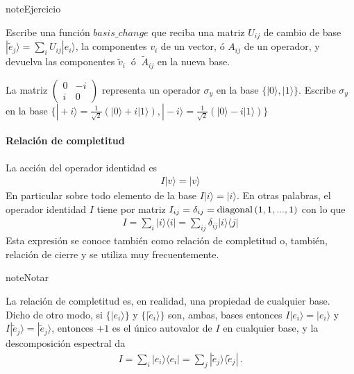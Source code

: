 \documentclass[letterpaper,10pt,english]{jupyterBook}
\newcommand{\ket}[1]{|#1\rangle}
\newcommand{\ketbra}[2]{| #1\rangle \langle #2 |}
\begin{document}
\begin{sphinxadmonition}{note}{Ejercicio}

\sphinxAtStartPar
Escribe una función \(basis\_change\) que reciba una matriz \(U_{ij}\) de cambio de base \(\ket{\tilde e_j} = \sum_i{U_{ij}}\ket{e_i}\), la componentes \(v_i\) de un vector, ó \(A_{ij}\) de un operador, y devuelva las componentes \(\tilde v_i~\) ó \(~\tilde A_{ij}\) en la nueva base.

\sphinxAtStartPar
La matriz \(\begin{pmatrix} 0 & -i \\ i & 0\end{pmatrix}\) representa un operador \(\sigma_y\) en la base \(\{\ket{0},\ket{1}\}\). Escribe \(\sigma_y\) en la base \(\{\ket{\!+\!i}= \frac{1}{\sqrt{2}}(\ket{0}+i \ket{1}),\ket{\!-\!i}= \frac{1}{\sqrt{2}}(\ket{0}-i \ket{1})\}\)
\end{sphinxadmonition}


\paragraph{Relación de completitud}
\label{\detokenize{docs/Part_01_Formalismo/Chapter_01_02_Formalismo_matem_xe1tico/01_03_Operadores_myst:relacion-de-completitud}}
\sphinxAtStartPar
La acción del operador identidad es
\begin{equation*}
\begin{split}
I\ket{v} = \ket{v}
\end{split}
\end{equation*}
\sphinxAtStartPar
En particular sobre todo elemento de la base \(I\ket{i} = \ket{i}\). En otras palabras,
el operador identidad \(I\) tiene por matriz \(I_{ij}=\delta_{ij}={\rm diagonal}\, (1,1,...,1)\) con lo que
\begin{equation*}
\begin{split}
I = \sum_{i}  \ketbra{i}{i}= \sum_{ij} \delta_{ij}\ketbra{i}{j} 
\end{split}
\end{equation*}
\sphinxAtStartPar
Esta expresión se conoce también como relación de completitud o, también, relación de cierre y se utiliza muy frecuentemente.

\begin{sphinxadmonition}{note}{Notar}

\sphinxAtStartPar
La relación de completitud es, en realidad, una propiedad de   cualquier base. Dicho de otro modo, si \(\{\ket{e_i}\}\) y \(\{\ket{\tilde e_i}\}\) son, ambas, bases entonces \(I\ket{e_i} = \ket{e_ i}\) y \(I\ket{\tilde e_j} = \ket{\tilde e_j}\), entonces \(+1\) es el único autovalor de \(I\) en cualquier base, y la descomposición espectral da
\begin{equation*}
\begin{split}
I =  \sum_{i}  \ketbra{e_i}{e_i} =  \sum_{j}  \ketbra{\tilde e_j}{ \tilde e_j}\, .
\end{split}
\end{equation*}\end{sphinxadmonition}
\end{document}
